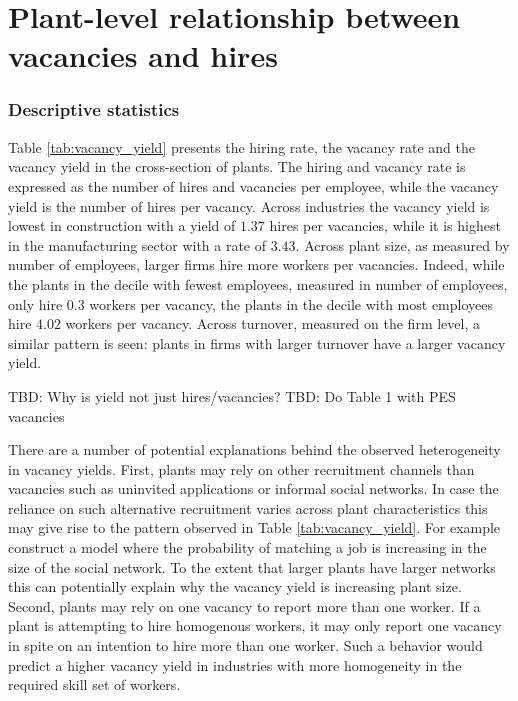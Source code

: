 \section{Plant-level relationship between vacancies and hires}
\label{sec:basic_rel}

\subsubsection{Descriptive statistics}



Table \ref{tab:vacancy_yield} presents the hiring rate, the vacancy rate and the vacancy yield in the cross-section of plants. The hiring and vacancy rate is expressed as the number of hires and vacancies per employee, while the vacancy yield is the number of hires per vacancy. Across industries the vacancy yield is lowest in construction with a yield of $1.37$ hires per vacancies, while it is highest in the manufacturing sector with a rate of $3.43$. Across plant size, as measured by number of employees, larger firms hire more workers per vacancies. Indeed, while the plants in the decile with fewest employees, measured in number of employees, only hire $0.3$ workers per vacancy, the plants in the decile with most employees hire $4.02$ workers per vacancy. Across turnover, measured on the firm level, a similar pattern is seen: plants in firms with larger turnover have a larger vacancy yield.

TBD: Why is yield not just hires/vacancies?
TBD: Do Table 1 with PES vacancies

There are a number of potential explanations behind the observed heterogeneity in vacancy yields. First, plants may rely on other recruitment channels than vacancies such as uninvited applications or informal social networks. In case the reliance on such alternative recruitment varies across plant characteristics this may give rise to the pattern observed in Table \ref{tab:vacancy_yield}. For example \cite{Cahuc2009} construct a model where the probability of matching a job is increasing in the size of the social network. To the extent that larger plants have larger networks this can potentially explain why the vacancy yield is increasing plant size. Second, plants may rely on one vacancy to report more than one worker. If a plant is attempting to hire homogenous workers, it may only report one vacancy in spite on an intention to hire more than one worker. Such a behavior would predict a higher vacancy yield in industries with more homogeneity in the required skill set of workers.


